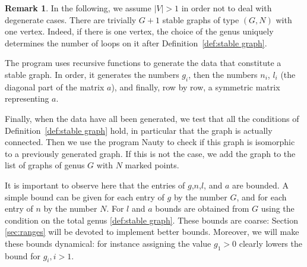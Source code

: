 \documentclass{amsart}
\theoremstyle{plain}
\theoremstyle{definition}
\newtheorem{remark}[theorem]{Remark}
\newcommand{\abs}[1]{\left|#1\right|}
\begin{document}
\begin{remark}
  In the following, we assume $\abs{V} > 1$ in order not to deal with
  degenerate cases. There are trivially $G+1$ stable graphs of type
  $(G, N)$ with one vertex. Indeed, if there is one vertex, the choice
  of the genus uniquely determines the number of loops on it after
  Definition~\ref{def:stable graph}.
\end{remark}

The program uses recursive functions to generate the data that
constitute a stable graph. In order, it generates the numbers $g_i$,
then the numbers $n_i$, $l_i$ (the diagonal part of the matrix $a$),
and finally, row by row, a symmetric matrix representing $a$.

Finally, when the data have all been generated, we test that all the
conditions of Definition~\ref{def:stable graph} hold, in particular
that the graph is actually connected. Then we use the program Nauty
\cite{nauty} to check if this graph is isomorphic to a previously
generated graph. If this is not the case, we add the graph to the list
of graphs of genus $G$ with $N$ marked points.



It is important to observe here that the entries of $g$,$n$,$l$, and $a$
are bounded. A simple bound can be given for each entry of $g$ by the 
number $G$, and for each entry of $n$ by the number $N$. For $l$ and
$a$ bounds are obtained from $G$ using the condition on the total genus
\ref{def:stable graph}. These bounds are coarse: Section \ref{sec:ranges}
will be devoted to implement better bounds. Moreover, we will
make these bounds dynamical: for instance assigning the value $g_1>0$
clearly lowers the bound for $g_i, i>1$.
\end{document}
